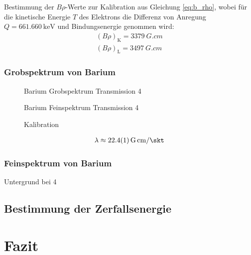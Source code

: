 \documentclass[11pt, a4paper]{article}
\numberwithin{equation}{section}
\begin{document}
Bestimmung der $B\rho$-Werte zur Kalibration aus Gleichung \ref{eq:b_rho}, wobei für die kinetische Energie $T$ des Elektrons die Differenz von Anregung $Q = \SI{661,660}{\kilo\electronvolt}$ und Bindungsenergie genommen wird:
\begin{align}
	\left(B \rho \right)_\mathrm{K} = \SI{3379}{G.cm} \\
	\left(B \rho \right)_\mathrm{L} = \SI{3497}{G.cm}
\end{align}


\subsubsection{Grobspektrum von Barium}
\begin{figure}
	\centering
	
	\caption{Barium Grobspektrum Transmission 4}
	\label{fig:ba_t4_grob}
\end{figure}
\begin{figure}
	\centering
	
	\caption{Barium Feinspektrum Transmission 4}
	\label{fig:ba_t4_grob}
\end{figure}
\begin{figure}
	\centering
	
	\caption{Kalibration}
	\label{fig:kalibration}
\end{figure}
\begin{align}
	\lambda \approx \SI{22.4 +- 0.1}{G.cm\per\skt}
\end{align}

\subsubsection{Feinspektrum von Barium}

\begin{table}[h]
	\centering
	
	\caption{Untergrund  bei 4}
	\label{tab:untergrund_ba4}
\end{table}
\subsection{Bestimmung der Zerfallsenergie}


\section{Fazit}
\end{document}
